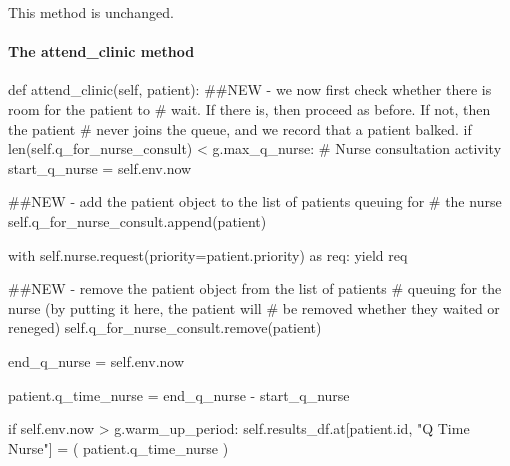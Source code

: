 \documentclass[
  letterpaper,
  DIV=11,
  numbers=noendperiod]{scrreprt}
\let\oldparagraph\paragraph
\renewcommand{\paragraph}[1]{\oldparagraph{#1}\mbox{}}
\newenvironment{Shaded}{\begin{snugshade}}{\end{snugshade}}
\newcommand{\BuiltInTok}[1]{\textcolor[rgb]{0.00,0.23,0.31}{#1}}
\newcommand{\CommentTok}[1]{\textcolor[rgb]{0.37,0.37,0.37}{#1}}
\newcommand{\ControlFlowTok}[1]{\textcolor[rgb]{0.00,0.23,0.31}{#1}}
\newcommand{\ImportTok}[1]{\textcolor[rgb]{0.00,0.46,0.62}{#1}}
\newcommand{\KeywordTok}[1]{\textcolor[rgb]{0.00,0.23,0.31}{#1}}
\newcommand{\NormalTok}[1]{\textcolor[rgb]{0.00,0.23,0.31}{#1}}
\newcommand{\OperatorTok}[1]{\textcolor[rgb]{0.37,0.37,0.37}{#1}}
\newcommand{\StringTok}[1]{\textcolor[rgb]{0.13,0.47,0.30}{#1}}
\newcommand{\VariableTok}[1]{\textcolor[rgb]{0.07,0.07,0.07}{#1}}
\begin{document}
This method is unchanged.

\paragraph{The attend\_clinic method}\label{the-attend_clinic-method-3}

\begin{Shaded}
\begin{Highlighting}[]
\KeywordTok{def}\NormalTok{ attend\_clinic(}\VariableTok{self}\NormalTok{, patient):}
        \CommentTok{\#\#NEW {-} we now first check whether there is room for the patient to}
        \CommentTok{\# wait.  If there is, then proceed as before.  If not, then the patient}
        \CommentTok{\# never joins the queue, and we record that a patient balked.}
        \ControlFlowTok{if} \BuiltInTok{len}\NormalTok{(}\VariableTok{self}\NormalTok{.q\_for\_nurse\_consult) }\OperatorTok{\textless{}}\NormalTok{ g.max\_q\_nurse:}
            \CommentTok{\# Nurse consultation activity}
\NormalTok{            start\_q\_nurse }\OperatorTok{=} \VariableTok{self}\NormalTok{.env.now}

            \CommentTok{\#\#NEW {-} add the patient object to the list of patients queuing for}
            \CommentTok{\# the nurse}
            \VariableTok{self}\NormalTok{.q\_for\_nurse\_consult.append(patient)}

            \ControlFlowTok{with} \VariableTok{self}\NormalTok{.nurse.request(priority}\OperatorTok{=}\NormalTok{patient.priority) }\ImportTok{as}\NormalTok{ req:}
                \ControlFlowTok{yield}\NormalTok{ req}

                \CommentTok{\#\#NEW {-} remove the patient object from the list of patients}
                \CommentTok{\# queuing for the nurse (by putting it here, the patient will}
                \CommentTok{\# be removed whether they waited or reneged)}
                \VariableTok{self}\NormalTok{.q\_for\_nurse\_consult.remove(patient)}

\NormalTok{                end\_q\_nurse }\OperatorTok{=} \VariableTok{self}\NormalTok{.env.now}

\NormalTok{                patient.q\_time\_nurse }\OperatorTok{=}\NormalTok{ end\_q\_nurse }\OperatorTok{{-}}\NormalTok{ start\_q\_nurse}

                \ControlFlowTok{if} \VariableTok{self}\NormalTok{.env.now }\OperatorTok{\textgreater{}}\NormalTok{ g.warm\_up\_period:}
                    \VariableTok{self}\NormalTok{.results\_df.at[patient.}\BuiltInTok{id}\NormalTok{, }\StringTok{"Q Time Nurse"}\NormalTok{] }\OperatorTok{=}\NormalTok{ (}
\NormalTok{                        patient.q\_time\_nurse}
\NormalTok{                    )}


\end{Highlighting}
\end{Shaded}
\end{document}
